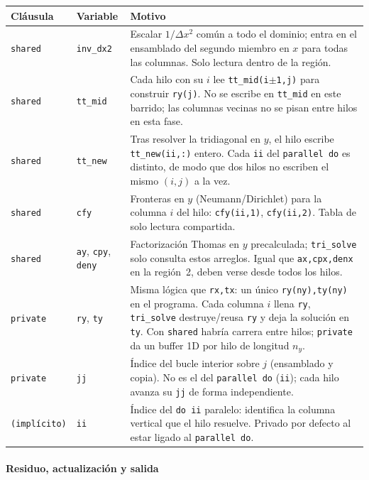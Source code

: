 \documentclass[11pt,a4paper]{article}
\begin{document}
\begin{center}
\footnotesize
\begin{tabular}{@{}llM{7.6cm}@{}}
\hline
Cl\'ausula & Variable & Motivo \\
\hline
\texttt{shared} & \texttt{inv\_dx2} &
Escalar $1/\Delta x^2$ com\'un a todo el dominio; entra en el ensamblado del
segundo miembro en $x$ para todas las columnas. Solo lectura dentro de la regi\'on. \\
\texttt{shared} & \texttt{tt\_mid} &
Cada hilo con su $i$ lee \texttt{tt\_mid(i$\pm$1,j)} para construir
\texttt{ry(j)}. No se escribe en \texttt{tt\_mid} en este barrido; las columnas
vecinas no se pisan entre hilos en esta fase. \\
\texttt{shared} & \texttt{tt\_new} &
Tras resolver la tridiagonal en $y$, el hilo escribe \texttt{tt\_new(ii,:)} entero.
Cada \texttt{ii} del \texttt{parallel do} es distinto, de modo que dos hilos no
escriben el mismo $(i,j)$ a la vez. \\
\texttt{shared} & \texttt{cfy} &
Fronteras en $y$ (Neumann/Dirichlet) para la columna $i$ del hilo:
\texttt{cfy(ii,1)}, \texttt{cfy(ii,2)}. Tabla de solo lectura compartida. \\
\texttt{shared} & \texttt{ay}, \texttt{cpy}, \texttt{deny} &
Factorizaci\'on Thomas en $y$ precalculada; \texttt{tri\_solve} solo consulta estos
arreglos. Igual que \texttt{ax,cpx,denx} en la regi\'on~2, deben verse desde todos
los hilos. \\
\texttt{private} & \texttt{ry}, \texttt{ty} &
Misma l\'ogica que \texttt{rx,tx}: un \'unico \texttt{ry(ny),ty(ny)} en el programa.
Cada columna $i$ llena \texttt{ry}, \texttt{tri\_solve} destruye/reusa \texttt{ry} y
deja la soluci\'on en \texttt{ty}. Con \texttt{shared} habr\'ia carrera entre hilos;
\texttt{private} da un buffer 1D por hilo de longitud $n_y$. \\
\texttt{private} & \texttt{jj} &
\'Indice del bucle interior sobre $j$ (ensamblado y copia). No es el del
\texttt{parallel do} (\texttt{ii}); cada hilo avanza su \texttt{jj} de forma
independiente. \\
\texttt{(impl\'icito)} & \texttt{ii} &
\'Indice del \texttt{do ii} paralelo: identifica la columna vertical que el hilo
resuelve. Privado por defecto al estar ligado al \texttt{parallel do}. \\
\hline
\end{tabular}
\end{center}

\paragraph{Residuo, actualizaci\'on y salida}
\label{subsec:omp-residuo-salida}
\end{document}
